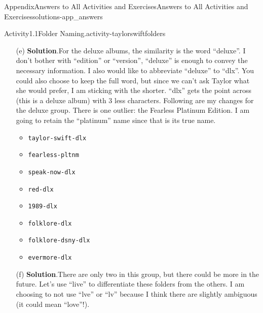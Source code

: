 \documentclass[oneside,10pt,]{book}
\newcommand{\blocktitlefont}{\relax}
\newcommand{\mono}[1]{\texttt{#1}}
\begin{document}
\begin{solutions-chapter}{Appendix}{Answers to All Activities and Exercises}{}{Answers to All Activities and Exercises}{}{}{solutions-app_answers}
\begin{activitysolution}{Activity}{1.1}{Folder Naming.}{activity-taylorswiftfolders}
\begin{enumerate}[font=\bfseries,label=(\alph*),ref=\alph*]
\begin{multicols}{2}
\begin{itemize}[label=\textbullet]
\item{}\mono{taylor-swift}%
\item{}\mono{fearless}%
\item{}\mono{speak-now}%
\item{}\mono{red}%
\item{}\mono{1989}%
\item{}\mono{reputation}%
\item{}\mono{lover}%
\item{}\mono{folklore}%
\item{}\mono{evermore}%
\item{}\mono{midnights}%
\end{itemize}
\end{multicols}
%
\item[(e)]\noindent\textbf{\blocktitlefont Solution}.\hypertarget{solution-taylorswiftfolders-h-b-back}{}\quad{}For the deluxe albums, the similarity is the word ``deluxe''. I don't bother with ``edition'' or ``version'', ``deluxe'' is enough to convey the necessary information. I also would like to abbreviate ``deluxe'' to ``dlx''. You could also choose to keep the full word, but since we can't ask Taylor what she would prefer, I am sticking with the shorter. ``dlx'' gets the point across (this is a deluxe album) with 3 less characters. Following are my changes for the deluxe group. There is one outlier: the Fearless Platinum Edition. I am going to retain the ``platinum'' name since that is its true name.%
\begin{multicols}{2}
\begin{itemize}[label=\textbullet]
\item{}\mono{taylor-swift-dlx}%
\item{}\mono{fearless-pltnm}%
\item{}\mono{speak-now-dlx}%
\item{}\mono{red-dlx}%
\item{}\mono{1989-dlx}%
\item{}\mono{folklore-dlx}%
\item{}\mono{folklore-dsny-dlx}%
\item{}\mono{evermore-dlx}%
\end{itemize}
\end{multicols}
%
\item[(f)]\noindent\textbf{\blocktitlefont Solution}.\hypertarget{solution-taylorswiftfolders-i-b-back}{}\quad{}There are only two in this group, but there could be more in the future. Let's use ``live'' to differentiate these folders from the others. I am choosing to not use ``lve'' or ``lv'' because I think there are slightly ambiguous (it could mean ``love''!).%

\end{enumerate}
\end{activitysolution}
\end{solutions-chapter}
\end{document}
